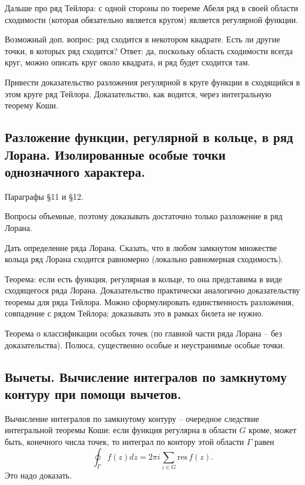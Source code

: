Дальше про ряд Тейлора: с одной стороны по тоереме Абеля ряд в своей области сходимости (которая обязательно является кругом) является регулярной функции.

Возможный доп. вопрос: ряд сходится в некотором квадрате. Есть ли другие точки, в которых ряд сходится? Ответ: да, поскольку область сходимости всегда круг, можно описать круг около квадрата, и ряд будет сходится там.

Привести доказательство разложения регулярной в круге функции в сходящийся в этом круге ряд Тейлора. Доказательство, как водится, через интегральную теорему Коши.

\subsection{Разложение функции, регулярной в кольце, в ряд Лорана. Изолированные особые точки однозначного характера.}

Параграфы \S11 и \S12.

Вопросы объемные, поэтому доказывать достаточно только разложение в ряд Лорана.

Дать определение ряда Лорана. Сказать, что в любом замкнутом множестве кольца ряд Лорана сходится равномерно (локально равномерная сходимость). 

Теорема: если есть функция, регулярная в кольце, то она представима в виде сходящегося ряда Лорана. Доказательство практически аналогично доказательству теоремы для ряда Тейлора. Можно сформулировать единственность разложения, совпадение с рядом Тейлора; доказывать это в рамках билета не нужно.

Теорема о классификации особых точек (по главной части ряда Лорана -- без доказательства). Полюса, существенно особые и неустранимые особые точки.

\subsection{Вычеты. Вычисление интегралов по замкнутому контуру при помощи вычетов.}

Вычисление интегралов по замкнутому контуру -- очередное следствие интегральной теоремы Коши: если функция регулярна в области $G$ кроме, может быть, конечного числа точек, то интеграл по контору этой области $\Gamma$ равен
\begin{equation*}
    \oint_{\Gamma} f(z) dz = 2\pi i \sum_{z \in G} \mathrm{res}\, f(z).
\end{equation*}
Это надо доказать.


